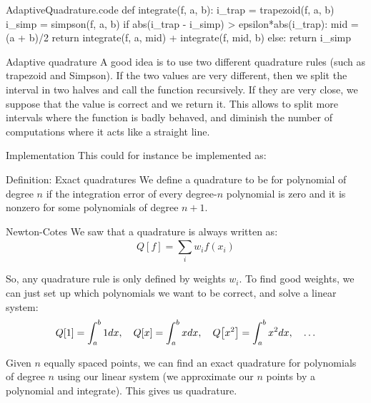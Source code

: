 \documentclass[a4paper]{article}
\begin{document}
\begin{filecontents*}[overwrite]{AdaptiveQuadrature.code}
def integrate(f, a, b):
    i_trap = trapezoid(f, a, b)
    i_simp = simpson(f, a, b)
    if abs(i_trap - i_simp) > epsilon*abs(i_trap):
        mid = (a + b)/2
        return integrate(f, a, mid) + integrate(f, mid, b)
    else:
        return i_simp
\end{filecontents*}


\begin{parag}{Adaptive quadrature}
    A good idea is to use two different quadrature rules (such as trapezoid and Simpson). If the two values are very different, then we split the interval in two halves and call the function recursively. If they are very close, we suppose that the value is correct and we return it. This allows to split more intervals where the function is badly behaved, and diminish the number of computations where it acts like a straight line.


    \begin{subparag}{Implementation}
        This could for instance be implemented as:
    \end{subparag}
    
\end{parag}

\begin{parag}{Definition: Exact quadratures}
    We define a quadrature to be  for polynomial of degree $n$ if the integration error of every degree-$n$ polynomial is zero and it is nonzero for some polynomials of degree $n+1$. 
\end{parag}


\begin{parag}{Newton-Cotes}
    We saw that a quadrature is always written as: 
    \[Q\left[f\right] = \sum_{i}^{} w_i f\left(x_i\right)\]
    
    So, any quadrature rule is only defined by weights $w_i$. To find good weights, we can just set up which polynomials we want to be correct, and solve a linear system: 
    \[Q\left[1\right] = \int_{a}^{b} 1dx, \mathspace Q\left[x\right] = \int_{a}^{b} xdx, \mathspace Q\left[x^2\right] = \int_{a}^{b} x^2 dx, \mathspace \ldots\]

    Given $n$ equally spaced points, we can find an exact quadrature for polynomials of degree $n$ using our linear system (we approximate our $n$ points by a polynomial and integrate). This gives us  quadrature.
\end{parag}
\end{document}
